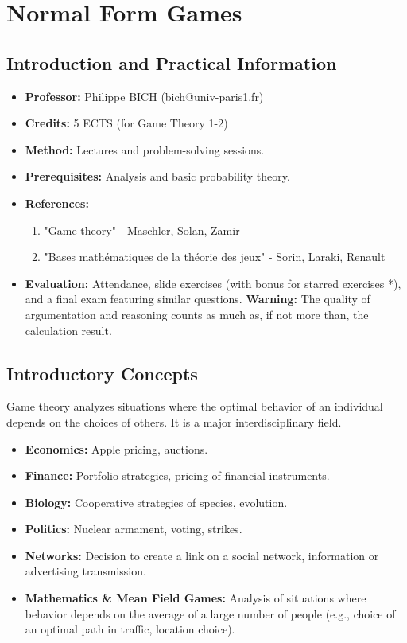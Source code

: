 \chapter{Normal Form Games}

\section{Introduction and Practical Information}

\begin{itemize}
    \item \textbf{Professor:} Philippe BICH (bich@univ-paris1.fr)
    \item \textbf{Credits:} 5 ECTS (for Game Theory 1-2)
    \item \textbf{Method:} Lectures and problem-solving sessions.
    \item \textbf{Prerequisites:} Analysis and basic probability theory.
    \item \textbf{References:}
        \begin{enumerate}
            \item "Game theory" - Maschler, Solan, Zamir
            \item "Bases mathématiques de la théorie des jeux" - Sorin, Laraki, Renault
        \end{enumerate}
    \item \textbf{Evaluation:} Attendance, slide exercises (with bonus for starred exercises *), and a final exam featuring similar questions. \textbf{Warning:} The quality of argumentation and reasoning counts as much as, if not more than, the calculation result.
\end{itemize}

\section{Introductory Concepts}
Game theory analyzes situations where the optimal behavior of an individual depends on the choices of others. It is a major interdisciplinary field.

\begin{itemize}
    \item \textbf{Economics:} Apple pricing, auctions.
    \item \textbf{Finance:} Portfolio strategies, pricing of financial instruments.
    \item \textbf{Biology:} Cooperative strategies of species, evolution.
    \item \textbf{Politics:} Nuclear armament, voting, strikes.
    \item \textbf{Networks:} Decision to create a link on a social network, information or advertising transmission.
    \item \textbf{Mathematics \& Mean Field Games:} Analysis of situations where behavior depends on the average of a large number of people (e.g., choice of an optimal path in traffic, location choice).
\end{itemize}

